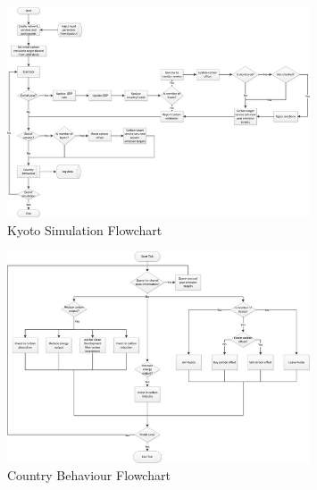 \begin{figure}[h!]
	\centering
	\includegraphics[width=0.8\textwidth]{img/kyoto_simulation_flowchart.png}
	\caption{Kyoto Simulation Flowchart}
	\label{fig:kyoto_simulation_flowchart}
\end{figure}

\begin{figure}[h!]
	\centering
	\includegraphics[width=0.8\textwidth]{img/country_behaviour_flowchart.png}
	\caption{Country Behaviour Flowchart}
	\label{fig:country_behaviour_flowchart}
\end{figure}
